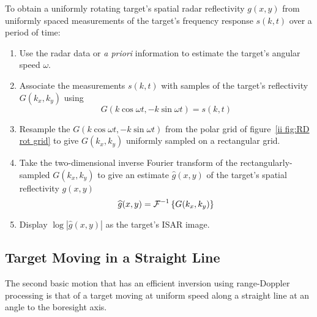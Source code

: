 \begin{algorithm}
\label{ii alg:RD rotating}\mbox{}\par

To obtain a uniformly rotating target's spatial radar reflectivity $g(x,y)$
from uniformly spaced measurements of the target's frequency response
$s(k,t)$ over a period of time:
\begin{enumerate}
\item Use the radar data or {\em a priori\/} information to estimate the 
target's angular speed $\omega$.

\item Associate the measurements $s(k,t)$ with samples of the target's
reflectivity $G(k_x,k_y)$ using
\begin{equation}
G(k\cos\omega t,-k\sin\omega t)=s(k,t)
\end{equation}

\item Resample the $G(k\cos\omega t,-k\sin\omega t)$ from the polar grid of
figure~\ref{ii fig:RD rot grid} to give $G(k_x,k_y)$ uniformly sampled on a 
rectangular grid.

\item Take the two-dimensional inverse Fourier transform of the
rectangularly-sampled $G(k_x,k_y)$ to give an estimate $\widehat{g}(x,y)$
of the target's spatial reflectivity $g(x,y)$
\begin{equation}
\widehat{g}(x,y)={\cal F}^{-1}\left\{G(k_x,k_y)\right\}
\end{equation}

\item Display $\log\left|\widehat{g}(x,y)\right|$ as the target's ISAR image.

\end{enumerate}
\end{algorithm}


\subsection{Target Moving in a Straight Line}

The second basic motion that has an efficient inversion using 
range-Doppler processing is that of a target moving at uniform speed along a
straight line at an angle to the boresight axis.  


